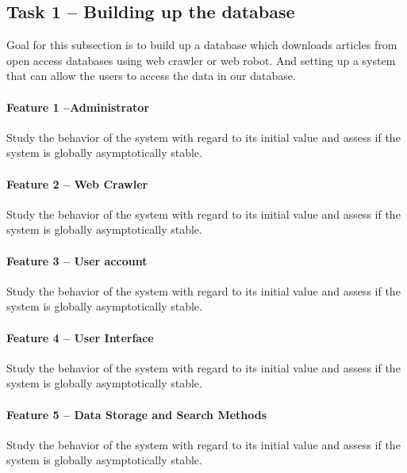 \documentclass[a4paper]{article} %
\begin{document}
	\subsection*{Task 1 -- Building up the database}
	\label{task1}
	
	Goal for this subsection is to build up a database which downloads articles from open access databases using web crawler or web robot. And setting up a system that can allow the users to access the data in our database.
	
	\paragraph*{Feature 1 --Administrator}
	\label{task1:feature1}
	
	Study the behavior of the system with regard to its initial value and assess if the system is globally asymptotically stable.
	
	\paragraph*{Feature 2 -- Web Crawler}
	\label{task1:feature2}
	
	Study the behavior of the system with regard to its initial value and assess if the system is globally asymptotically stable.
	
	\paragraph*{Feature 3 -- User account}
	\label{task1:feature3}
	
	Study the behavior of the system with regard to its initial value and assess if the system is globally asymptotically stable.
	
	\paragraph*{Feature 4 -- User Interface}
	\label{task1:feature4}
	
	Study the behavior of the system with regard to its initial value and assess if the system is globally asymptotically stable.
	
	\paragraph*{Feature 5 -- Data Storage and Search Methods}
	\label{task1:feature5}
	
	Study the behavior of the system with regard to its initial value and assess if the system is globally asymptotically stable.
	
\end{document}
